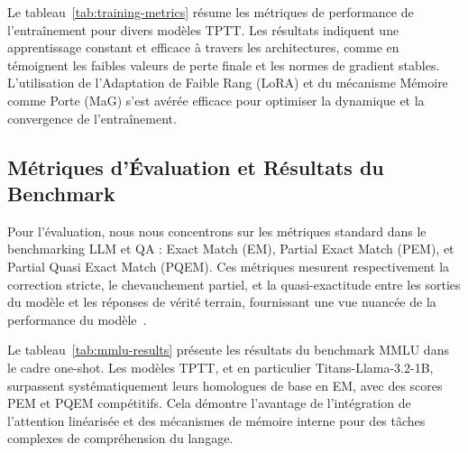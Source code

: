 \documentclass[10pt,a4paper]{article}
\begin{document}
Le tableau~\ref{tab:training-metrics} résume les métriques de performance de l'entraînement pour divers modèles TPTT. Les résultats indiquent une apprentissage constant et efficace à travers les architectures, comme en témoignent les faibles valeurs de perte finale et les normes de gradient stables. L'utilisation de l'Adaptation de Faible Rang (LoRA) et du mécanisme Mémoire comme Porte (MaG) s'est avérée efficace pour optimiser la dynamique et la convergence de l'entraînement.

\begin{table}[h!]
    \centering
    \caption{Métriques de performance d'entraînement pour les modèles TPTT.}
    \label{tab:training-metrics}
\end{table}

\subsection{Métriques d'Évaluation et Résultats du Benchmark}

Pour l'évaluation, nous nous concentrons sur les métriques standard dans le benchmarking LLM et QA : Exact Match (EM), Partial Exact Match (PEM), et Partial Quasi Exact Match (PQEM). Ces métriques mesurent respectivement la correction stricte, le chevauchement partiel, et la quasi-exactitude entre les sorties du modèle et les réponses de vérité terrain, fournissant une vue nuancée de la performance du modèle~\cite{hendrycks2020measuring}.

Le tableau~\ref{tab:mmlu-results} présente les résultats du benchmark MMLU dans le cadre one-shot. Les modèles TPTT, et en particulier Titans-Llama-3.2-1B, surpassent systématiquement leurs homologues de base en EM, avec des scores PEM et PQEM compétitifs. Cela démontre l'avantage de l'intégration de l'attention linéarisée et des mécanismes de mémoire interne pour des tâches complexes de compréhension du langage.
\end{document}
